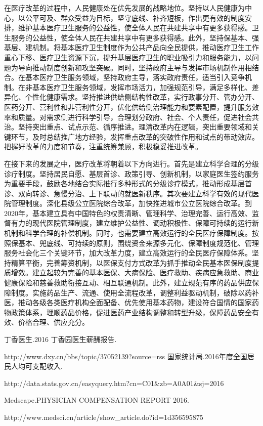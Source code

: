 \documentclass[11pt,twoside,a4paper]{article}
\begin{document}
		在医疗改革的过程中，人民健康处在优先发展的战略地位。坚持以人民健康为中心，以公平可及、群众受益为目标，坚守底线、补齐短板，作出更有效的制度安排，维护基本医疗卫生服务的公益性，使全体人民在共建共享中有更多获得感。卫生服务的公益性，使全体人民在共建共享中有更多获得感。此外，坚持保基本、强基层、建机制。将基本医疗卫生制度作为公共产品向全民提供，推动医疗卫生工作重心下移、医疗卫生资源下沉，提升基层医疗卫生的职业吸引力和服务能力，以问题为导向推动制度创新和攻坚突破。同时，坚持政府主导与发挥市场机制作用相结合。在基本医疗卫生服务领域，坚持政府主导，落实政府责任，适当引入竞争机制。在非基本医疗卫生服务领域，发挥市场活力，加强规范引导，满足多样化、差异化、个性化健康需求。坚持推进供给侧结构性改革，实行政事分开、管办分开、医药分开、营利性和非营利性分开，优化供给侧治理能力和要素配置，提升服务效率和质量。对需求侧进行科学引导，合理划分政府、社会、个人责任，促进社会共治。坚持突出重点、试点示范、循序推进。理清改革内在逻辑，突出重要领域和关键环节，及时总结推广地方经验，发挥重点改革的突破性作用和试点的带动效应。把握好改革的力度和节奏，注重统筹兼顾，积极稳妥推进改革。
		
		在接下来的发展之中，医疗改革将朝着以下方向进行。首先是建立科学合理的分级诊疗制度。坚持居民自愿、基层首诊、政策引导、创新机制，以家庭医生签约服务为重要手段，鼓励各地结合实际推行多种形式的分级诊疗模式，推动形成基层首诊、双向转诊、急慢分治、上下联动的就医新秩序。其次要建立科学有效的现代医院管理制度。深化县级公立医院综合改革，加快推进城市公立医院综合改革。到2020年，基本建立具有中国特色的权责清晰、管理科学、治理完善、运行高效、监督有力的现代医院管理制度，建立维护公益性、调动积极性、保障可持续的运行新机制和科学合理的补偿机制。同时，也需要建立高效运行的全民医疗保障制度。按照保基本、兜底线、可持续的原则，围绕资金来源多元化、保障制度规范化、管理服务社会化三个关键环节，加大改革力度，建立高效运行的全民医疗保障体系。坚持精算平衡，完善筹资机制，以医保支付方式改革为抓手推动全民基本医保制度提质增效。建立起较为完善的基本医保、大病保险、医疗救助、疾病应急救助、商业健康保险和慈善救助衔接互动、相互联通机制。此外，建立规范有序的药品供应保障制度。实施药品生产、流通、使用全流程改革，调整利益驱动机制，破除以药补医，推动各级各类医疗机构全面配备、优先使用基本药物，建设符合国情的国家药物政策体系，理顺药品价格，促进医药产业结构调整和转型升级，保障药品安全有效、价格合理、供应充分。
		
		
		
		\begin{thebibliography}{99}  
			丁香医生.2016 丁香园医生薪酬报告.
			
			http://www.dxy.cn/bbs/topic/37052139?source=rss
			国家统计局.2016年度全国居民人均可支配收入.
			
			http://data.stats.gov.cn/easyquery.htm?cn=C01\&zb=A0A01\&sj=2016 
			
			Medscape.PHYSICIAN COMPENSATION REPORT 2016.
			
			http://www.medsci.cn/article/show\_article.do?id=1d356595875
		\end{thebibliography} 
\end{document}
